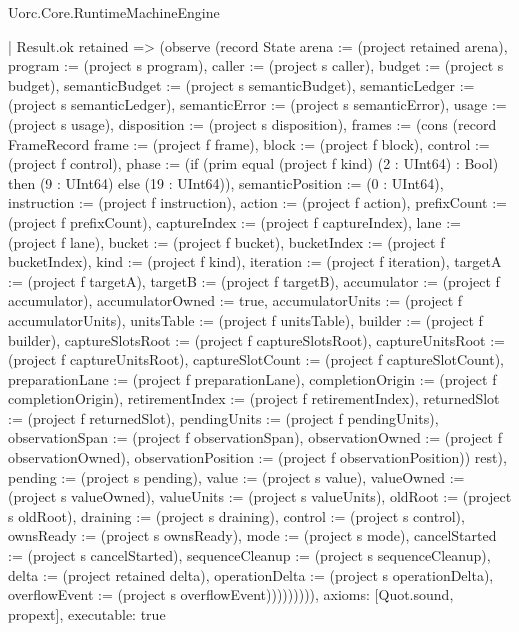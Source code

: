 \begin{lexlean}{Uorc.Core.RuntimeMachineEngine}
\begin{semanticmodule}
{      | Result.ok retained => (observe (record State {arena := (project retained arena), program := (project s program), caller := (project s caller), budget := (project s budget), semanticBudget := (project s semanticBudget), semanticLedger := (project s semanticLedger), semanticError := (project s semanticError), usage := (project s usage), disposition := (project s disposition), frames := (cons (record FrameRecord {frame := (project f frame), block := (project f block), control := (project f control), phase := (if (prim equal (project f kind) (2 : UInt64) : Bool) then (9 : UInt64) else (19 : UInt64)), semanticPosition := (0 : UInt64), instruction := (project f instruction), action := (project f action), prefixCount := (project f prefixCount), captureIndex := (project f captureIndex), lane := (project f lane), bucket := (project f bucket), bucketIndex := (project f bucketIndex), kind := (project f kind), iteration := (project f iteration), targetA := (project f targetA), targetB := (project f targetB), accumulator := (project f accumulator), accumulatorOwned := true, accumulatorUnits := (project f accumulatorUnits), unitsTable := (project f unitsTable), builder := (project f builder), captureSlotsRoot := (project f captureSlotsRoot), captureUnitsRoot := (project f captureUnitsRoot), captureSlotCount := (project f captureSlotCount), preparationLane := (project f preparationLane), completionOrigin := (project f completionOrigin), retirementIndex := (project f retirementIndex), returnedSlot := (project f returnedSlot), pendingUnits := (project f pendingUnits), observationSpan := (project f observationSpan), observationOwned := (project f observationOwned), observationPosition := (project f observationPosition)}) rest), pending := (project s pending), value := (project s value), valueOwned := (project s valueOwned), valueUnits := (project s valueUnits), oldRoot := (project s oldRoot), draining := (project s draining), control := (project s control), ownsReady := (project s ownsReady), mode := (project s mode), cancelStarted := (project s cancelStarted), sequenceCleanup := (project s sequenceCleanup), delta := (project retained delta), operationDelta := (project s operationDelta), overflowEvent := (project s overflowEvent)})))))))),
  axioms: [Quot.sound, propext],
  executable: true
}


\end{semanticmodule}
\end{lexlean}
